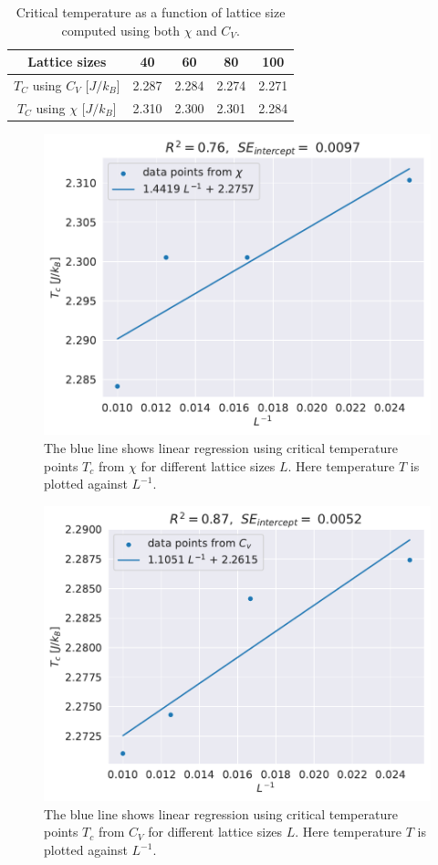 \documentclass[english,notitlepage,reprint,nofootinbib]{revtex4-1}  %
\begin{document}
\begin{table}
    \centering
    \caption{Critical temperature as a function of lattice size computed using both $\chi$ and $C_V$.}
    \label{tab:critical_T}
    \begin{tabular}{|c|c|c|c|c|}
        \hline
        Lattice sizes                & 40    & 60    & 80    & 100   \\
        \hline
        $T_C$ using $C_V$ [$J/k_B$]  & 2.287 & 2.284 & 2.274 & 2.271 \\
        \hline
        $T_C$ using $\chi$ [$J/k_B$] & 2.310 & 2.300 & 2.301 & 2.284 \\
        \hline
    \end{tabular}
\end{table}
\begin{figure}[H]
    \centering
    \includegraphics[width=.5\textwidth]{../figures/linregress_X.pdf}
    \caption{The blue line shows linear regression using critical temperature points $T_c$ from $\chi$ for different lattice sizes $L$. Here temperature $T$ is plotted against $L^{-1}$.}
    \label{fig:linregress_X}
\end{figure}
\begin{figure}[H]
    \centering
    \includegraphics[width=.5\textwidth]{../figures/linregress_cv.pdf}
    \caption{The blue line shows linear regression using critical temperature points $T_c$ from $C_V$ for different lattice sizes $L$. Here temperature $T$ is plotted against $L^{-1}$.}
    \label{fig:linregress_cv}
\end{figure}
\end{document}
